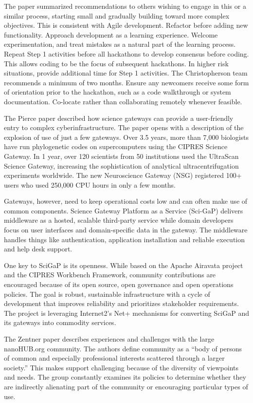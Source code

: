 \documentclass[11pt, oneside]{amsart}
\begin{document}
The paper summarized recommendations to others wishing to engage in this or a
similar process, starting small and gradually building toward more complex
objectives. This is consistent with Agile development. Refactor before adding
new functionality. Approach development as a learning experience. Welcome
experimentation, and treat mistakes as a natural part of the learning process.
Repeat Step 1 activities before all hackathons to develop consensus before
coding. This allows coding to be the focus of subsequent hackathons. In higher
risk situations, provide additional time for Step 1 activities. The
Christopherson team recommends a minimum of two months. Ensure any newcomers
receive some form of orientation prior to the hackathon, such as a code
walkthrough or system documentation. Co-locate rather than collaborating
remotely whenever feasible.

The Pierce paper described how science gateways can provide a user-friendly
entry to complex cyberinfrastructure. The paper opens with a description of the
explosion of use of just a few gateways. Over 3.5 years, more than 7,000
biologists have run phylogenetic codes on supercomputers using the CIPRES
Science Gateway. In 1 year, over 120 scientists from 50 institutions used the
UltraScan Science Gateway, increasing the sophistication of analytical
ultracentrifugation experiments worldwide. The new Neuroscience Gateway (NSG)
registered 100+ users who used 250,000 CPU hours in only a few months.

Gateways, however, need to keep operational costs low and can often make use of
common components. Science Gateway Platform as a Service (Sci-GaP) delivers
middleware as a hosted, scalable third-party service while domain developers
focus on user interfaces and domain-specific data in the gateway. The
middleware handles things like authentication, application installation and
reliable execution and help desk support.

One key to SciGaP is its openness. While based on the Apache Airavata project
and the CIPRES Workbench Framework, community contributions are encouraged
because of its open source, open governance and open operations policies. The
goal is robust, sustainable infrastructure with a cycle of development that
improves reliability and prioritizes stakeholder requirements. The project is
leveraging Internet2's Net+ mechanisms for converting SciGaP and its gateways
into commodity services.

The Zentner paper describes experiences and challenges with the large
nanoHUB.org community. The authors define community as a ``body of persons of
common and especially professional interests scattered through a larger
society.'' This makes support challenging because of the diversity of
viewpoints and needs. The group constantly examines its policies to determine
whether they are indirectly alienating part of the community or encouraging
particular types of use.
\end{document}
